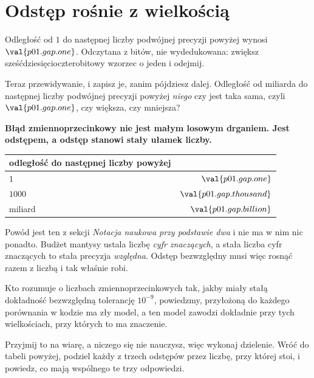 
\section{Odstęp rośnie z wielkością}
\label{sec:P01-gap}

\begin{fr}
Odległość od $1$ do następnej liczby podwójnej precyzji powyżej wynosi
$\val{p01.gap.one}$. Odczytana z bitów, nie wydedukowana: zwiększ
sześćdziesięcioczterobitowy wzorzec o jeden i odejmij.

Teraz przewidywanie, i zapisz je, zanim pójdziesz dalej. Odległość od miliarda
do następnej liczby podwójnej precyzji powyżej \emph{niego} \dash{} czy jest
taka sama, czyli $\val{p01.gap.one}$, czy większa, czy mniejsza?
\nextframe
\end{fr}

\begin{fr}
\begin{trapbox}
\textbf{Błąd zmiennoprzecinkowy nie jest małym losowym drganiem. Jest
odstępem, a odstęp stanowi stały ułamek liczby.}

\begin{center}
\begin{tabular}{lr}
\toprule
odległość do następnej liczby powyżej & \\
\midrule
$1$ & $\val{p01.gap.one}$ \\
$1000$ & $\val{p01.gap.thousand}$ \\
miliard & $\val{p01.gap.billion}$ \\
\bottomrule
\end{tabular}
\end{center}

Powód jest ten z sekcji \emph{Notacja naukowa przy podstawie dwa} i nie ma w
nim nic ponadto. Budżet mantysy ustala liczbę \emph{cyfr znaczących}, a stała
liczba cyfr znaczących to stała precyzja \emph{względna}. Odstęp bezwzględny
musi więc rosnąć razem z liczbą i tak właśnie robi.

Kto rozumuje o liczbach zmiennoprzecinkowych tak, jakby miały stałą dokładność
bezwzględną \dash{} tolerancję $10^{-9}$, powiedzmy, przyłożoną do każdego
porównania w kodzie \dash{} ma zły model, a ten model zawodzi dokładnie przy
tych wielkościach, przy których to ma znaczenie.
\end{trapbox}

Przyjmij to na wiarę, a niczego się nie nauczysz, więc wykonaj dzielenie. Wróć
do tabeli powyżej, podziel każdy z trzech odstępów przez liczbę, przy której
stoi, i powiedz, co mają wspólnego te trzy odpowiedzi.
\dotline
\nextframe
\end{fr}


